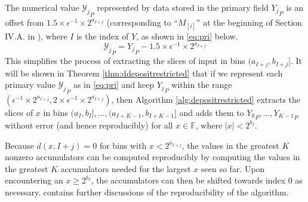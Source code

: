 \documentclass[12pt]{article}
\providecommand{\F}{\ensuremath{\mathbb{F}}}
\theoremstyle{definition}
\numberwithin{equation}{section}
\numberwithin{figure}{section}
\begin{document}
      The numerical value ${\mathcal{Y}_j}_P$ represented by data stored in the primary field ${Y_j}_P$ is an offset from $1.5\times \epsilon^{-1} \times 2^{a_{I + j}}$ (corresponding to ``$M_{[i]}$'' at the beginning of Section IV.A. in \cite{repsum}), where $I$ is the index of $Y$, as shown in  \eqref{eq:pri} below.
      \begin{equation}
        {\mathcal{Y}_j}_P = {Y_j}_P - 1.5\times\epsilon^{-1}\times2^{a_{I + j}}
        \label{eq:pri}
      \end{equation}
      This simplifies the process of extracting the slices of input in bins $(a_{I + j}, b_{I + j}]$. It will be shown in Theorem \ref{thm:ddepositrestricted} that if we represent each primary value ${\mathcal{Y}_j}_P$ as in \eqref{eq:pri} and keep ${Y_j}_P$ within the range $(\epsilon^{-1} \times 2^{a_{I + j}}, 2 \times \epsilon^{-1} \times 2^{a_{I + j}})$, then Algorithm \ref{alg:depositrestricted} extracts the slices of $x$ in bins $(a_I, b_I], ..., (a_{I + K - 1}, b_{I + K - 1}]$ and adds them to ${Y_0}_P, ..., {Y_{K - 1}}_P$ without error (and hence reproducibly) for all $x \in \F$, where $|x| < 2^{b_I}$.

      Because $d(x, I + j) = 0$ for bins with $x < 2^{a_{I + j}}$, the values in the greatest $K$ nonzero accumulators can be computed reproducibly by computing the values in the greatest $K$ accumulators needed for the largest $x$ seen so far. Upon encountering an $x \geq 2^{b_I}$, the accumulators can then be shifted towards index $0$ as necessary. \cite{repsum} contains further discussions of the reproducibility of the algorithm.
\end{document}
